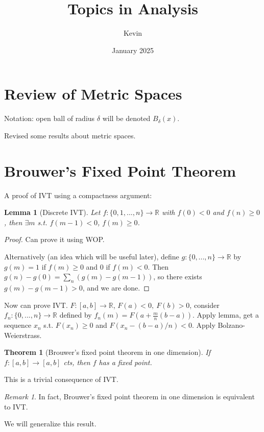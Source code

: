 \documentclass{article}
\title{Topics in Analysis}
\author{Kevin}
\date{January 2025}
\theoremstyle{definition}
\theoremstyle{remark}
\newtheorem{rem}{Remark}
\theoremstyle{plain}
\newtheorem{lem}[defn]{Lemma}
\newtheorem{thm}[defn]{Theorem}
\newcommand{\RR}{\mathbb{R}}
\begin{document}
\maketitle
\section{Review of Metric Spaces}
Notation: open ball of radius $\delta$ will be denoted $B_\delta(x)$.

Revised some results about metric spaces.

\section{Brouwer's Fixed Point Theorem}
A proof of IVT using a compactness argument:
\begin{lem}[Discrete IVT]
    Let $f:\{0,1,...,n\}\to\RR$ with $f(0)<0$ and $f(n)\ge 0$, then $\exists m$ s.t. $f(m-1)<0$, $f(m)\ge 0$.
\end{lem}
\begin{proof}
    Can prove it using WOP.

    Alternatively (an idea which will be useful later), define $g:\{0,...,n\}\to\RR$ by $g(m)=1$ if $f(m)\ge 0$ and $0$ if $f(m)<0$. Then $g(n)-g(0)=\sum_n(g(m)-g(m-1))$, so there exists $g(m)-g(m-1)>0$, and we are done. 
\end{proof}
Now can prove IVT. $F:[a,b]\to\RR$, $F(a)<0,\ F(b)>0$, consider $f_n:\{0,...,n\}\to\RR$ defined by $f_n(m)=F(a+\frac{m}{n}(b-a))$. Apply lemma, get a sequence $x_n$ s.t. $F(x_n)\ge 0$ and $F(x_n-(b-a)/n)<0$. Apply Bolzano-Weierstrass.

\begin{thm}[Brouwer's fixed point theorem in one dimension]
    If $f:[a,b]\to[a,b]$ cts, then $f$ has a fixed point.
\end{thm}
This is a trivial consequence of IVT.

\begin{rem}
    In fact, Brouwer's fixed point theorem in one dimension is equivalent to IVT.
\end{rem}

We will generalize this result.
\end{document}
